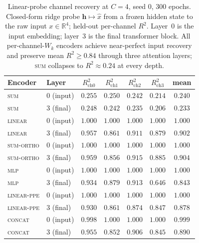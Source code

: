 \begin{table}[t]
\centering
\caption{Linear-probe channel recovery at $C{=}4$, seed 0, 300 epochs.
Closed-form ridge probe $\mathbf{h} \mapsto \hat{x}$ from a frozen hidden
state to the raw input $x \in \mathbb{R}^4$; held-out per-channel
$R^2$. Layer~0 is the input embedding; layer~3 is the final transformer
block. All per-channel-$W_k$ encoders achieve near-perfect input
recovery and preserve mean $R^2 \ge 0.84$ through three attention
layers; \textsc{sum} collapses to $R^2 \approx 0.24$ at every depth.}
\label{tab:probe}
\begin{tabular}{llccccc}
\toprule
Encoder & Layer & $R^2_{\text{ch0}}$ & $R^2_{\text{ch1}}$ & $R^2_{\text{ch2}}$ & $R^2_{\text{ch3}}$ & mean \\
\midrule
\textsc{sum}        & 0 (input) & $0.255$ & $0.250$ & $0.242$ & $0.214$ & $0.240$ \\
\textsc{sum}        & 3 (final) & $0.248$ & $0.242$ & $0.235$ & $0.206$ & $0.233$ \\
\textsc{linear}     & 0 (input) & $1.000$ & $1.000$ & $1.000$ & $1.000$ & $1.000$ \\
\textsc{linear}     & 3 (final) & $0.957$ & $0.861$ & $0.911$ & $0.879$ & $0.902$ \\
\textsc{sum-ortho}  & 0 (input) & $1.000$ & $1.000$ & $1.000$ & $1.000$ & $1.000$ \\
\textsc{sum-ortho}  & 3 (final) & $0.959$ & $0.856$ & $0.915$ & $0.885$ & $0.904$ \\
\textsc{mlp}        & 0 (input) & $1.000$ & $1.000$ & $1.000$ & $1.000$ & $1.000$ \\
\textsc{mlp}        & 3 (final) & $0.934$ & $0.879$ & $0.913$ & $0.646$ & $0.843$ \\
\textsc{linear-ppe} & 0 (input) & $1.000$ & $1.000$ & $1.000$ & $1.000$ & $1.000$ \\
\textsc{linear-ppe} & 3 (final) & $0.930$ & $0.861$ & $0.874$ & $0.847$ & $0.878$ \\
\textsc{concat}     & 0 (input) & $0.998$ & $1.000$ & $1.000$ & $1.000$ & $0.999$ \\
\textsc{concat}     & 3 (final) & $0.955$ & $0.852$ & $0.906$ & $0.845$ & $0.890$ \\
\bottomrule
\end{tabular}
\end{table}

